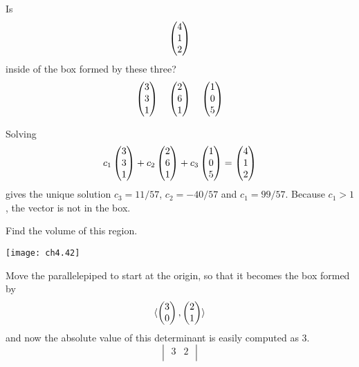 \begin{exercises}
  \recommended \item 
    Is
    \begin{equation*}
      \begin{pmatrix} 4 \\ 1 \\ 2 \end{pmatrix}
    \end{equation*}
    inside of the box formed by these three?
    \begin{equation*}
      \begin{pmatrix} 3 \\ 3 \\ 1 \end{pmatrix}
      \quad
      \begin{pmatrix} 2 \\ 6 \\ 1 \end{pmatrix}
      \quad
      \begin{pmatrix} 1 \\ 0 \\ 5 \end{pmatrix}
    \end{equation*}
    \begin{answer}
      Solving
      \begin{equation*}
        c_1\begin{pmatrix} 3 \\ 3 \\ 1 \end{pmatrix}
        +c_2\begin{pmatrix} 2 \\ 6 \\ 1 \end{pmatrix}
        +c_3\begin{pmatrix} 1 \\ 0 \\ 5 \end{pmatrix}
        =\begin{pmatrix} 4 \\ 1 \\ 2 \end{pmatrix}
      \end{equation*}
      gives the unique solution
      \( c_3=11/57 \), \( c_2=-40/57 \) and \( c_1=99/57 \).
      Because \( c_1>1 \), the vector is not in the box.  
    \end{answer}
  \recommended \item 
    Find the volume of this region.
    \begin{center}
      \texttt{[image: ch4.42]}  
    \end{center}
    \begin{answer}
      Move the parallelepiped to start at the origin,
      so that it becomes the box formed by 
      \begin{equation*}
        \langle
          \begin{pmatrix} 3 \\ 0 \end{pmatrix},
          \begin{pmatrix} 2 \\ 1 \end{pmatrix}
        \rangle      
      \end{equation*}
      and now the absolute value of this determinant is 
      easily computed as $3$.
      \begin{equation*}
        \begin{vmatrix}
          3  &2  \\

\end{vmatrix}
\end{equation*}
\end{answer}
\end{exercises}
